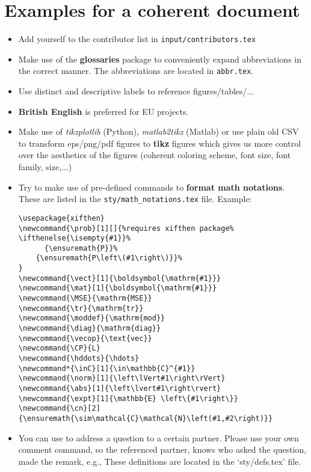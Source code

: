 
\chapter{Examples for a coherent document}\label{ch:deliverable-guidelines}


\begin{itemize}
    \item Add yourself to the contributor list in \texttt{input/contributors.tex}
    \item Make use of the \textbf{glossaries} package to conveniently expand abbreviations in the correct manner. The abbreviations are located in \texttt{abbr.tex}.
    \item Use distinct and descriptive labels to reference figures/tables/...
\item \textbf{British English} is preferred for EU projects.
\item Make use of \textit{tikzplotlib} (Python),  \textit{matlab2tikz} (Matlab) or use plain old CSV to transform eps/png/pdf figures to \textbf{tikz} figures which gives us more control over the aesthetics of the figures (coherent coloring scheme, font size, font family, size,...)
\item Try to make use of pre-defined commands to \textbf{format math notations}. These are listed in the \texttt{sty/math\_notations.tex} file. Example:
\begin{verbatim}
\usepackage{xifthen}
\newcommand{\prob}[1][]{%requires xifthen package%
\ifthenelse{\isempty{#1}}%
      {\ensuremath{P}}%
    {\ensuremath{P\left\(#1\right\)}}%
}
\newcommand{\vect}[1]{\boldsymbol{\mathrm{#1}}}
\newcommand{\mat}[1]{\boldsymbol{\mathrm{#1}}}
\newcommand{\MSE}{\mathrm{MSE}}
\newcommand{\tr}{\mathrm{tr}}
\newcommand{\moddef}{\mathrm{mod}}
\newcommand{\diag}{\mathrm{diag}}
\newcommand{\vecop}{\text{vec}}
\newcommand{\CP}{L}
\newcommand{\hddots}{\hdots}
\newcommand*{\inC}[1]{\in\mathbb{C}^{#1}}
\newcommand{\norm}[1]{\left\lVert#1\right\rVert}
\newcommand{\abs}[1]{\left\lvert#1\right\rvert}
\newcommand{\expt}[1]{\mathbb{E} \left\{#1\right\}}
\newcommand{\cn}[2]{\ensuremath{\sim\mathcal{C}\mathcal{N}\left(#1,#2\right)}}
\end{verbatim}
\item You can use \atkul to address a question to a certain partner. Please use your own comment command, so the referenced partner, knows who asked the question, made the remark, e.g.,  These definitions are located in the `sty/defs.tex' file.
\end{itemize}

